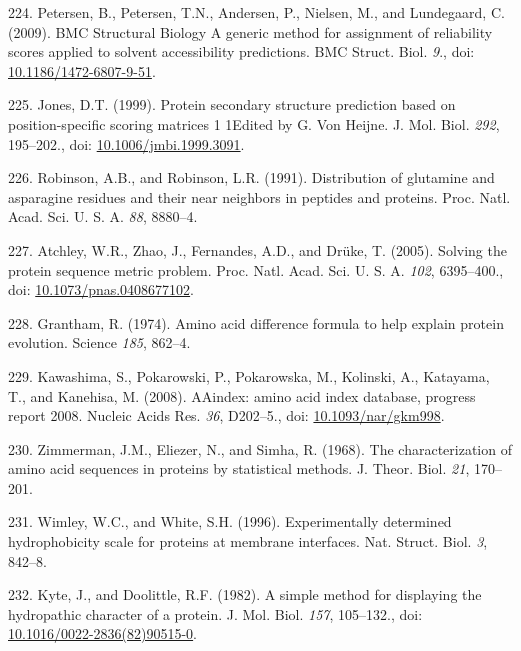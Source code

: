 \documentclass[11pt,a4paper,twoside]{book}
\theoremstyle{definition}
\theoremstyle{definition}
\theoremstyle{remark}
\begin{document}
\hypertarget{ref-Petersen2009a}{}
224. Petersen, B., Petersen, T.N., Andersen, P., Nielsen, M., and
Lundegaard, C. (2009). BMC Structural Biology A generic method for
assignment of reliability scores applied to solvent accessibility
predictions. BMC Struct. Biol. \emph{9}., doi:
\href{https://doi.org/10.1186/1472-6807-9-51}{10.1186/1472-6807-9-51}.

\hypertarget{ref-Jones1999}{}
225. Jones, D.T. (1999). Protein secondary structure prediction based on
position-specific scoring matrices 1 1Edited by G. Von Heijne. J. Mol.
Biol. \emph{292}, 195--202., doi:
\href{https://doi.org/10.1006/jmbi.1999.3091}{10.1006/jmbi.1999.3091}.

\hypertarget{ref-Robinson1991}{}
226. Robinson, A.B., and Robinson, L.R. (1991). Distribution of
glutamine and asparagine residues and their near neighbors in peptides
and proteins. Proc. Natl. Acad. Sci. U. S. A. \emph{88}, 8880--4.

\hypertarget{ref-Atchley2005}{}
227. Atchley, W.R., Zhao, J., Fernandes, A.D., and Drüke, T. (2005).
Solving the protein sequence metric problem. Proc. Natl. Acad. Sci. U.
S. A. \emph{102}, 6395--400., doi:
\href{https://doi.org/10.1073/pnas.0408677102}{10.1073/pnas.0408677102}.

\hypertarget{ref-Grantham1974}{}
228. Grantham, R. (1974). Amino acid difference formula to help explain
protein evolution. Science \emph{185}, 862--4.

\hypertarget{ref-Kawashima2008}{}
229. Kawashima, S., Pokarowski, P., Pokarowska, M., Kolinski, A.,
Katayama, T., and Kanehisa, M. (2008). AAindex: amino acid index
database, progress report 2008. Nucleic Acids Res. \emph{36}, D202--5.,
doi: \href{https://doi.org/10.1093/nar/gkm998}{10.1093/nar/gkm998}.

\hypertarget{ref-Zimmerman1968}{}
230. Zimmerman, J.M., Eliezer, N., and Simha, R. (1968). The
characterization of amino acid sequences in proteins by statistical
methods. J. Theor. Biol. \emph{21}, 170--201.

\hypertarget{ref-Wimley1996}{}
231. Wimley, W.C., and White, S.H. (1996). Experimentally determined
hydrophobicity scale for proteins at membrane interfaces. Nat. Struct.
Biol. \emph{3}, 842--8.

\hypertarget{ref-Kyte1982}{}
232. Kyte, J., and Doolittle, R.F. (1982). A simple method for
displaying the hydropathic character of a protein. J. Mol. Biol.
\emph{157}, 105--132., doi:
\href{https://doi.org/10.1016/0022-2836(82)90515-0}{10.1016/0022-2836(82)90515-0}.
\end{document}
